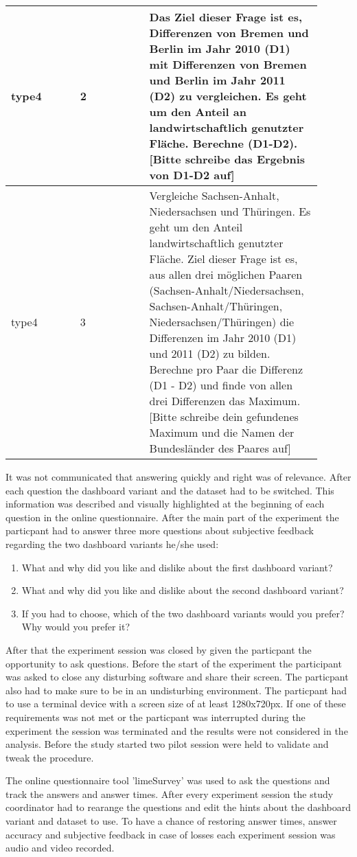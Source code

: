 \begin{longtable}{| p{0.20\linewidth} | p{0.20\linewidth} | p{0.50\linewidth}|}
    \hline
    type4 & 2 & \parbox{\linewidth}{\vspace{4pt} Das Ziel dieser Frage ist es, Differenzen von Bremen und Berlin im Jahr 2010 (D1) mit Differenzen von Bremen und Berlin im Jahr 2011 (D2) zu vergleichen. Es geht um den Anteil an landwirtschaftlich genutzter Fläche. Berechne (D1-D2). [Bitte schreibe das Ergebnis von D1-D2 auf]} \\
    \hline
    type4 & 3 & \parbox{\linewidth}{\vspace{4pt} Vergleiche Sachsen-Anhalt, Niedersachsen und Thüringen. Es geht um den Anteil landwirtschaftlich genutzter Fläche. Ziel dieser Frage ist es, aus allen drei möglichen Paaren (Sachsen-Anhalt/Niedersachsen, Sachsen-Anhalt/Thüringen, Niedersachsen/Thüringen) die Differenzen im Jahr 2010 (D1) und 2011 (D2) zu bilden. Berechne pro Paar die Differenz (D1 - D2) und finde von allen drei Differenzen das Maximum. [Bitte schreibe dein gefundenes Maximum und die Namen der Bundesländer des Paares auf]} \\
\end{longtable}
It was not communicated that answering quickly and right was of relevance. After each question the dashboard variant and the dataset had to
be switched. This information was described and visually highlighted at the beginning of each question in the online questionnaire. After the
main part of the experiment the particpant had to answer three more questions about subjective feedback regarding the two dashboard variants
he/she used:
\begin{enumerate}
    \item What and why did you like and dislike about the first dashboard variant?
    \item What and why did you like and dislike about the second dashboard variant?
    \item If you had to choose, which of the two dashboard variants would you prefer? Why would you prefer it?
\end{enumerate}
After that the experiment session was closed by given the particpant the opportunity to ask questions. Before the start of the experiment the 
participant was asked to close any disturbing software and share their screen. The particpant also had to make sure to be in an 
undisturbing environment. The particpant had to use a terminal device with a screen size of at least 1280x720px. If one of these requirements
was not met or the particpant was interrupted during the experiment the session was terminated and the results were not considered in the
analysis. Before the study started two pilot session were held to validate and tweak the procedure.

The online questionnaire tool 'limeSurvey' was used to ask the questions and track the answers and answer times. After every experiment session
the study coordinator had to rearange the questions and edit the hints about the dashboard variant and dataset to use. To have a chance of
restoring answer times, answer accuracy and subjective feedback in case of losses each experiment session was audio and video recorded.